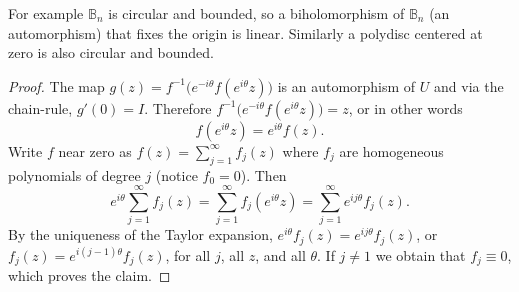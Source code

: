 \documentclass[12pt,openany]{book}
\newcommand{\bB}{{\mathbb{B}}}
\theoremstyle{plain}
\theoremstyle{remark}
\theoremstyle{definition}
\theoremstyle{exercise}
\theoremstyle{example}
\begin{document}
For example $\bB_n$ is circular and bounded, so a biholomorphism of $\bB_n$
(an automorphism)
that fixes the origin is linear.  Similarly a polydisc centered at zero is
also circular and bounded.

\begin{proof}
The map $g(z) = f^{-1}\bigl(e^{-i\theta}f(e^{i\theta} z)\bigr)$ is an
automorphism of $U$ and via the
chain-rule, $g'(0) = I$.  Therefore
$f^{-1}\bigl(e^{-i\theta}f(e^{i\theta} z)\bigr) = z$, or in other words
\begin{equation*}
f(e^{i\theta} z) = e^{i\theta}f(z) .
\end{equation*}
Write $f$ near zero as $f(z) = \sum_{j=1}^\infty f_j(z)$ where $f_j$ are
homogeneous polynomials of degree $j$ (notice $f_0 = 0$).  Then
\begin{equation*}
e^{i\theta} \sum_{j=1}^\infty f_j(z) 
=
\sum_{j=1}^\infty f_j(e^{i\theta} z)
=
\sum_{j=1}^\infty e^{ij\theta}f_j(z) .
\end{equation*}
By the uniqueness of the Taylor expansion, 
$e^{i\theta} f_j(z)  = e^{ij\theta} f_j(z)$, or
$f_j(z)  = e^{i(j-1)\theta} f_j(z)$,
for all $j$, all $z$, and all $\theta$.
If $j\not=1$ we obtain that $f_j \equiv
0$, which proves the claim.
\end{proof}
\end{document}

